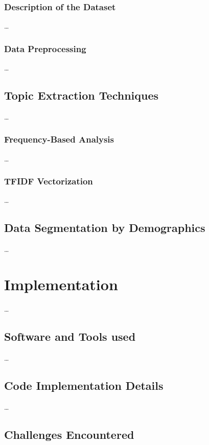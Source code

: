 \documentclass[conference,a4paper]{IEEEtran}
\begin{document}
\subsubsection{Description of the Dataset}

\dots

\subsubsection{Data Preprocessing}

\dots

\subsection{Topic Extraction Techniques}

\dots

\subsubsection{Frequency-Based Analysis}

\dots

\subsubsection{TFIDF Vectorization}

\dots

\subsection{Data Segmentation by Demographics}

\dots


\section{Implementation}

\dots

\subsection{Software and Tools used}

\dots

\subsection{Code Implementation Details}

\dots

\subsection{Challenges Encountered}
\end{document}
